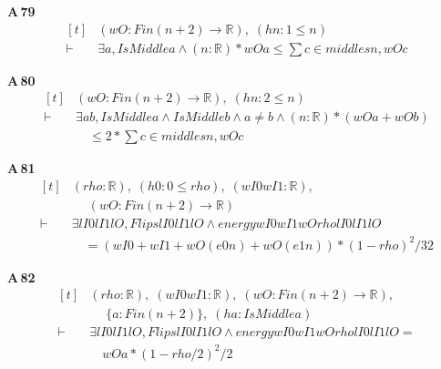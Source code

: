 \noindent\textbf{A\,79}\quad{}
{\footnotesize\[ \begin{aligned}[t]
&(\mathit{wO} : \mathit{Fin} (\mathit{n}+2) \to \mathbb{R} ),\; (\mathit{hn} : 1 \leq \mathit{n})\\
\vdash\;&\exists \mathit{a}, \mathit{IsMiddle} \mathit{a} \wedge (\mathit{n}:\mathbb{R} )*\mathit{wO} \mathit{a} \leq \textstyle\sum \mathit{c} \in \mathit{middles} \mathit{n}, \mathit{wO} \mathit{c}
\end{aligned} \]}

\noindent\textbf{A\,80}\quad{}
{\footnotesize\[ \begin{aligned}[t]
&(\mathit{wO} : \mathit{Fin} (\mathit{n}+2) \to \mathbb{R} ),\; (\mathit{hn} : 2 \leq \mathit{n})\\
\vdash\;&\exists \mathit{a} \mathit{b}, \mathit{IsMiddle} \mathit{a} \wedge \mathit{IsMiddle} \mathit{b} \wedge \mathit{a} \neq \mathit{b} \wedge (\mathit{n}:\mathbb{R} )*(\mathit{wO} \mathit{a} + \mathit{wO} \mathit{b})\\
&\quad \leq 2*\textstyle\sum \mathit{c} \in \mathit{middles} \mathit{n}, \mathit{wO} \mathit{c}
\end{aligned} \]}

\noindent\textbf{A\,81}\quad{}
{\footnotesize\[ \begin{aligned}[t]
&(\mathit{rho} : \mathbb{R} ),\; (\mathit{h0} : 0 \leq \mathit{rho}),\; (\mathit{wI0} \mathit{wI1} : \mathbb{R} ),\\
&\quad \; (\mathit{wO} : \mathit{Fin} (\mathit{n}+2) \to \mathbb{R} )\\
\vdash\;&\exists \mathit{lI0} \mathit{lI1} \mathit{lO}, \mathit{Flips} \mathit{lI0} \mathit{lI1} \mathit{lO} \wedge \mathit{energy} \mathit{wI0} \mathit{wI1} \mathit{wO} \mathit{rho} \mathit{lI0} \mathit{lI1} \mathit{lO}\\
&\quad = (\mathit{wI0} + \mathit{wI1} + \mathit{wO} (\mathit{e0} \mathit{n}) + \mathit{wO} (\mathit{e1} \mathit{n}))*(1-\mathit{rho})^{2}/32
\end{aligned} \]}

\noindent\textbf{A\,82}\quad{}
{\footnotesize\[ \begin{aligned}[t]
&(\mathit{rho} : \mathbb{R} ),\; (\mathit{wI0} \mathit{wI1} : \mathbb{R} ),\; (\mathit{wO} : \mathit{Fin} (\mathit{n}+2) \to \mathbb{R} ),\\
&\quad \; \{ \mathit{a} : \mathit{Fin} (\mathit{n}+2)\},\; (\mathit{ha} : \mathit{IsMiddle} \mathit{a})\\
\vdash\;&\exists \mathit{lI0} \mathit{lI1} \mathit{lO}, \mathit{Flips} \mathit{lI0} \mathit{lI1} \mathit{lO} \wedge \mathit{energy} \mathit{wI0} \mathit{wI1} \mathit{wO} \mathit{rho} \mathit{lI0} \mathit{lI1} \mathit{lO} =\\
&\quad \mathit{wO} \mathit{a}*(1-\mathit{rho}/2)^{2}/2
\end{aligned} \]}

